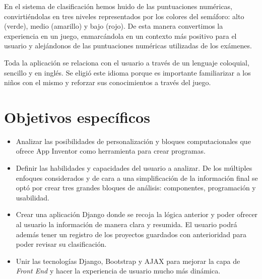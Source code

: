 \documentclass[a4paper, 12pt]{book}
\begin{document}
En el sistema de clasificación hemos huido de las puntuaciones numéricas, convirtiéndolas en tres niveles representados por los colores del semáforo: alto (verde), medio (amarillo) y bajo (rojo). De esta manera convertimos la experiencia en un juego, enmarcándola en un contexto más positivo para el usuario y alejándonos de las puntuaciones numéricas utilizadas de los exámenes. 

Toda la aplicación se relaciona con el usuario a través de un lenguaje coloquial, sencillo y en inglés. Se eligió este idioma porque es importante familiarizar a los niños con el mismo y reforzar sus conocimientos a través del juego.

\section{Objetivos específicos}
\label{sec:objetivos-especificos}
\begin{itemize}
  \item Analizar las posibilidades de personalización y bloques computacionales que ofrece App Inventor como herramienta para crear programas.

  \item Definir las habilidades y capacidades del usuario a analizar. De los múltiples enfoques considerados y de cara a una simplificación de la información final se optó por crear tres grandes bloques de análisis: componentes, programación y usabilidad.

  \item Crear una aplicación Django donde se recoja la lógica anterior y poder ofrecer al usuario la información de manera clara y resumida. El usuario podrá además tener un registro de los proyectos guardados con anterioridad para poder revisar su clasificación. 
  
  \item Unir las tecnologías Django, Bootstrap y AJAX para mejorar la capa de \textit{Front End} y hacer la experiencia de usuario mucho más dinámica.   
\end{itemize}
\end{document}
